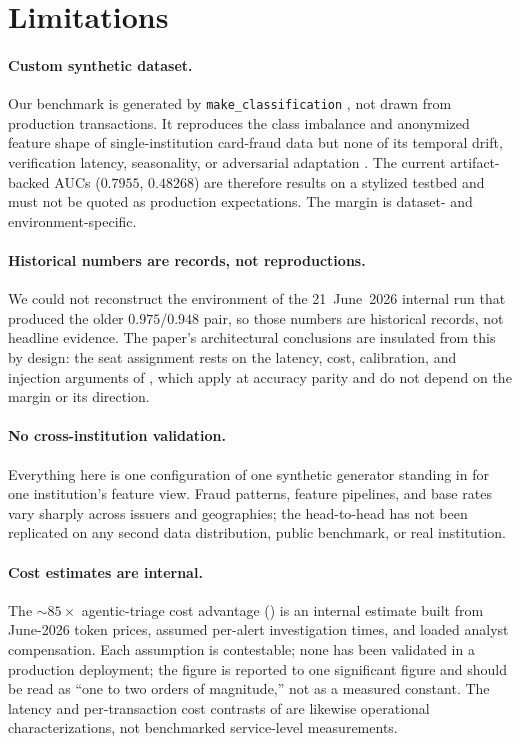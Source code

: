 \section{Limitations}
\label{sec:p8-limitations}

\paragraph{Custom synthetic dataset.} Our benchmark is generated by
\texttt{make\_classification} \citep{pedregosa2011sklearn}, not drawn from
production transactions. It reproduces the class imbalance and anonymized
feature shape of single-institution card-fraud data but none of its temporal
drift, verification latency, seasonality, or adversarial adaptation
\citep{dalpozzolo2018realistic}. The current artifact-backed AUCs
($0.7955$, $0.48268$) are therefore results on a stylized testbed and must not
be quoted as production expectations. The margin is dataset- and
environment-specific.

\paragraph{Historical numbers are records, not reproductions.} We could not
reconstruct the environment of the 21~June~2026 internal run that produced the
older $0.975$/$0.948$ pair, so those numbers are historical records, not
headline evidence. The paper's architectural conclusions are
insulated from this by design: the seat assignment rests on the latency, cost,
calibration, and injection arguments of , which apply at
accuracy parity and do not depend on the margin or its direction.

\paragraph{No cross-institution validation.} Everything here is one
configuration of one synthetic generator standing in for one institution's
feature view. Fraud patterns, feature pipelines, and base rates vary sharply
across issuers and geographies; the head-to-head has not been replicated on
any second data distribution, public benchmark, or real institution.

\paragraph{Cost estimates are internal.} The $\sim$$85\times$ agentic-triage
cost advantage () is an internal estimate built
from June-2026 token prices, assumed per-alert investigation times, and loaded
analyst compensation. Each assumption is contestable; none has been validated
in a production deployment; the figure is reported to one significant figure
and should be read as ``one to two orders of magnitude,'' not as a measured
constant. The latency and per-transaction cost contrasts of
 are likewise operational characterizations, not
benchmarked service-level measurements.

